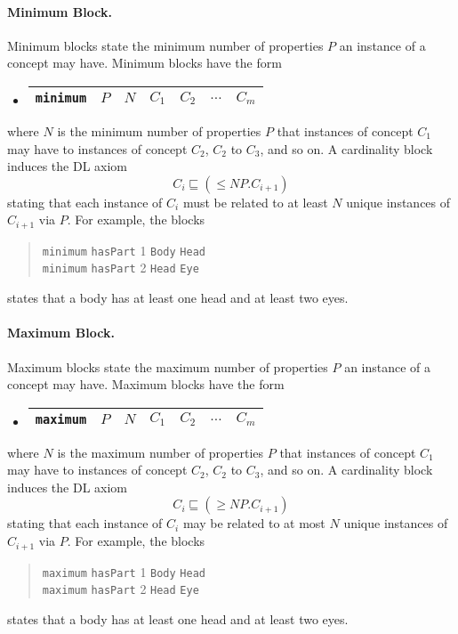\documentclass[preprint,number]{elsarticle}
\begin{document}
\paragraph{Minimum Block.} Minimum blocks state the minimum
number of properties $P$ an instance of a concept may have.
Minimum blocks have the form
\begin{itemize}
\item[]
  \begin{tabular}{|l|l|l|l|l|l|l|}\hline \texttt{minimum} & $P$ & $N$ & 
    $C_1$ & $C_2$ & $\dots$ & $C_m$
    \\ \hline
  \end{tabular}
\end{itemize}
where $N$ is the minimum number of properties $P$ that instances of
concept $C_1$ may have to instances of concept $C_2$, $C_2$ to $C_3$,
and so on. A cardinality block induces the DL axiom \[C_i \sqsubseteq
(\le N P.C_{i+1})\] stating that each instance of $C_i$ must be related to
at least $N$ unique instances of $C_{i+1}$ via $P$. For example, the blocks
\begin{quote}
\texttt{minimum} \texttt{hasPart} 1 \texttt{Body} \texttt{Head} \\
\texttt{minimum} \texttt{hasPart} 2 \texttt{Head} \texttt{Eye}
\end{quote}
states that a body has at least one head and at least two eyes.

\paragraph{Maximum Block.} Maximum blocks state the maximum
number of properties $P$ an instance of a concept may have.
Maximum blocks have the form
\begin{itemize}
\item[]
  \begin{tabular}{|l|l|l|l|l|l|l|}\hline \texttt{maximum} & $P$ & $N$ & 
    $C_1$ & $C_2$ & $\dots$ & $C_m$
    \\ \hline
  \end{tabular}
\end{itemize}
where $N$ is the maximum number of properties $P$ that instances of
concept $C_1$ may have to instances of concept $C_2$, $C_2$ to $C_3$,
and so on. A cardinality block induces the DL axiom \[C_i \sqsubseteq
(\ge N P.C_{i+1})\] stating that each instance of $C_i$ may be related to
at most $N$ unique instances of $C_{i+1}$ via $P$. For example, the blocks
\begin{quote}
\texttt{maximum} \texttt{hasPart} 1 \texttt{Body} \texttt{Head} \\
\texttt{maximum} \texttt{hasPart} 2 \texttt{Head} \texttt{Eye}
\end{quote}
states that a body has at least one head and at least two eyes.
\end{document}
